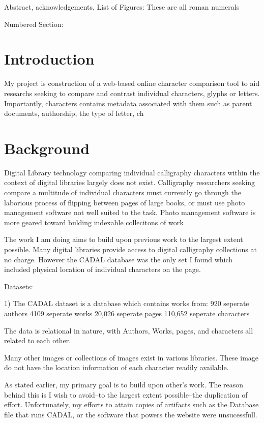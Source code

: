 Abstract, acknowledgements, List of Figures:  These are all roman numerals

Numbered Section:

\section{Introduction}

My project is construction of a web-based online character comparison tool to aid researchs seeking to compare and contrast individual characters, glyphs or letters.  Importantly, characters contains metadata associated with them such as parent documents, authorship, the type of letter, ch




\section{Background}

Digital Library technology comparing individual calligraphy characters within the context of digital libraries largely does not exist.  Calligraphy researchers seeking compare a multitude of individual characters must currently go through the laborious process of flipping between pages of large books, or must use photo management software not well suited to the task.  Photo management software is more geared toward bulding indexable collecitons of work

The work I am doing aims to build upon previous work to the largest extent possible.  Many digital libraries provide access to digital calligraphy collections at no charge.  However the CADAL database was the only set I found which included physical location of individual characters on the page.

Datasets:

1)  The CADAL dataset is a database which contains works from:
    920 seperate authors
    4109 seperate works
    20,026 seperate pages
    110,652 seperate characters
    
    The data is relational in nature, with Authors, Works, pages, and characters all related to each other.

    Many other images or collections of images exist in various libraries.  These image do not have the location information of each character readily available.
    
    
    As stated earlier, my primary goal is to build upon other's work.  The reason behind this is I wish to avoid--to the largest extent possible--the duplication of effort.  Unfortunately, my efforts to attain copies of artifacts such as the Database file that runs CADAL, or the software that powers the website were unsucessfull.
    
